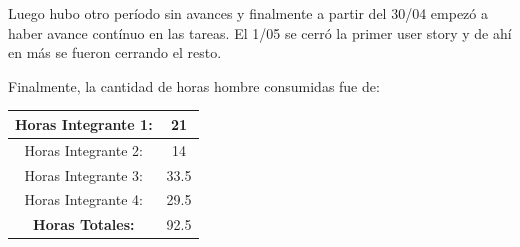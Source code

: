 Luego hubo otro período sin avances y finalmente
a partir del 30/04 empezó a haber avance contínuo en las tareas. El 1/05 se cerró la primer user story y de ahí en más se fueron cerrando el resto.

Finalmente, la cantidad de horas hombre consumidas fue de:

\vspace{0.3cm}
\begin{tabular}{ | c | c | }
 \hline
 Horas Integrante 1: & 21\\
 \hline
 Horas Integrante 2: & 14\\
 \hline
 Horas Integrante 3: & 33.5\\
 \hline
 Horas Integrante 4: & 29.5\\
 \hline
 {\bf Horas Totales:} & 92.5\\
 \hline
\end{tabular}

